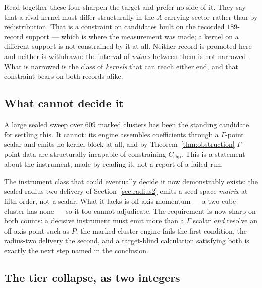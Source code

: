 \documentclass[11pt]{article}
\theoremstyle{plain}
\theoremstyle{definition}
\theoremstyle{remark}
\newcommand{\chk}[1]{}
\begin{document}
Read together these four sharpen the target and prefer no side of it. They say
that a rival kernel must differ structurally in the $A$-carrying sector rather
than by redistribution. That is a constraint on candidates built on the
recorded $189$-record support --- which is where the measurement was made; a
kernel on a different support is not constrained by it at all. Neither record is promoted here and neither is withdrawn: the interval of
\emph{values} between them is not narrowed. What is narrowed is the class of
\emph{kernels} that can reach either end, and that constraint bears on both
records alike.

\subsection{What cannot decide it}

A large sealed sweep over $609$ marked clusters has been the standing candidate
for settling this. It cannot: its engine assembles coefficients through a
$\Gamma$-point scalar and emits no kernel block at all, and by
Theorem~\ref{thm:obstruction} $\Gamma$-point data are structurally incapable of
constraining $C_{\mathrm{shp}}$. This is a statement about the instrument, made
by reading it, not a report of a failed run.
\chk{FINDING: the marked-cluster engine emits the Gamma scalar only — a completed 609-sweep cannot decide C\_shp}

The instrument class that could eventually decide it now demonstrably
exists: the sealed radius-two delivery of Section~\ref{sec:radius2} emits a
seed-space \emph{matrix} at fifth order, not a scalar. What it lacks is
off-axis momentum --- a two-cube cluster has none --- so it too cannot
adjudicate. The requirement is now sharp on both counts: a decisive
instrument must emit more than a $\Gamma$ scalar \emph{and} resolve an
off-axis point such as $P$; the marked-cluster engine fails the first
condition, the radius-two delivery the second, and a target-blind
calculation satisfying both is exactly the next step named in the
conclusion.

\subsection{The tier collapse, as two integers}
\end{document}
